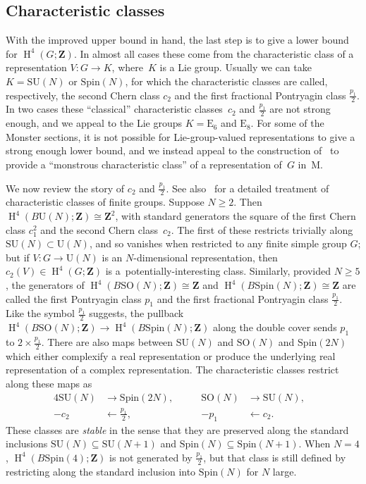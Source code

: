\documentclass[pdftex]{sigma}
\numberwithin{equation}{section}
\newcommand\bZ{\mathbf Z}
\newcommand\rM{\mathrm M}
\DeclareMathOperator\homology{H}
\renewcommand\H{\homology}
\newcommand\mapsfrom\leftarrow
\newcommand\<\langle
\renewcommand\>\rangle
\newcommand\Spin{\mathrm{Spin}}
\newcommand\SU{\mathrm{SU}}
\begin{document}
\subsection{Characteristic classes} \label{subsec:charclasses}

 With the improved upper bound in hand, the last step is to give a lower bound for $\H^4(G;\bZ)$. In almost all cases these come from the characteristic class of a representation $V\colon G \to K$, where~$K$ is a Lie group. Usually we can take $K = \SU(N)$ or $\Spin(N)$, for which the characteristic classes are called, respectively, the second Chern class $c_2$ and the first fractional Pontryagin class $\frac{p_1}2$. In two cases these ``classical'' characteristic classes~$c_2$ and $\frac{p_1}2$ are not strong enough, and we appeal to the Lie groups $K = \mathrm{E}_6$ and $\mathrm{E}_8$. For some of the Monster sections, it is not possible for Lie-group-valued representations to give a strong enough lower bound, and we instead appeal to the construction of~\cite{JFmoonshine} to provide a ``monstrous characteristic class'' of a representation of~$G$ in~$\rM$.

 We now review the story of $c_2$ and $\frac{p_1}2$. See also~\cite{MR878978} for a detailed treatment of characteristic classes of finite groups.
Suppose $N \geq 2$. Then $\H^4(B\mathrm{U}(N);\bZ) \cong \bZ^2$, with standard generators the square of the first Chern class $c_1^2$ and the second Chern class~$c_2$. The first of these restricts trivially along $\SU(N) \subset \mathrm{U}(N)$, and so vanishes when restricted to any finite simple group $G$; but if $V\colon G \to \mathrm{U}(N)$ is an $N$-dimensional representation, then $c_2(V) \in \H^4(G;\bZ)$ is a~potentially-interesting class. Similarly, provided $N \geq 5$, the generators of $\H^4(B\mathrm{SO}(N);\bZ) \cong \bZ$ and $\H^4(B\Spin(N);\bZ) \cong \bZ$ are called the first Pontryagin class $p_1$ and the first fractional Pontryagin class $\frac{p_1}2$. Like the symbol $\frac{p_1}{2}$ suggests, the pullback $\H^4(B\mathrm{SO}(N);\bZ) \to \H^4(B\Spin(N);\bZ)$ along the double cover sends $p_1$ to $2 \times \frac{p_1}2$.
There are also maps between $\SU(N)$ and $\mathrm{SO}(N)$ and $\Spin(2N)$ which either complexify a real representation or produce the underlying real representation of a complex representation. The characteristic classes restrict along these maps as
\begin{alignat*}{4}
 \SU(N) & \to \Spin(2N), \qquad & \mathrm{SO}(N) & \to \SU(N), &\\
 -c_2 & \mapsfrom \tfrac{p_1}2, \qquad & -p_1 & \mapsfrom c_2. &
\end{alignat*}
These classes are {\it stable} in the sense that they are preserved along the standard inclusions $\SU(N) \subseteq \SU(N+1)$ and $\Spin(N) \subseteq \Spin(N+1)$. When $N = 4$, $\H^4(B\Spin(4);\bZ)$ is not gene\-ra\-ted by $\frac{p_1}2$, but that class is still defined by restricting along the standard inclusion into $\Spin(N)$ for $N$ large.
\end{document}
